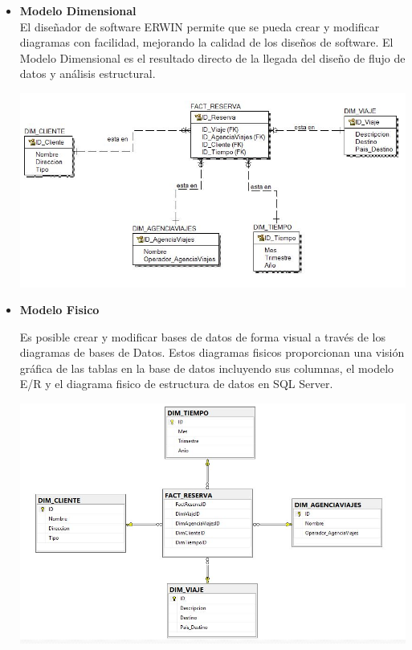 \begin{itemize}
    \item \textbf{Modelo Dimensional}
\\
El diseñador de software ERWIN permite que se pueda crear y modificar diagramas con facilidad, mejorando la calidad de los diseños de software. El Modelo Dimensional es el resultado directo de la llegada del diseño de flujo de datos y análisis estructural.

	\begin{center}
	\includegraphics[width=17cm]{./Imagenes/Ejercicio2Logico}
	\end{center}	

    \item \textbf{Modelo Fisico}

Es posible crear y modificar bases de datos de forma visual a través de los diagramas de bases de Datos. Estos diagramas fisicos proporcionan una visión gráfica de las tablas en la base de datos incluyendo sus columnas, el modelo E/R y el diagrama fisico de estructura de datos en SQL Server.

	\begin{center}
	\includegraphics[width=17cm]{./Imagenes/Ejercicio2Fisico}
	\end{center}	


\end{itemize}
